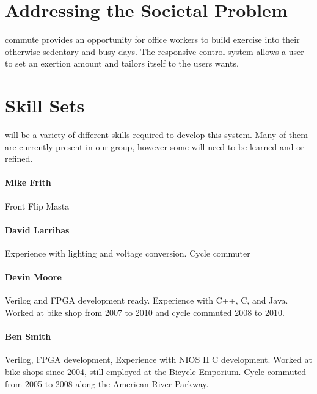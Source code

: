 \documentclass[12pt,article]{IEEEtran}
\begin{document}

	 
\section{Addressing the Societal Problem}
	
     commute provides an opportunity for office workers to build exercise into 
    their otherwise sedentary and busy days. The responsive control system allows a user to set an 
	exertion amount and tailors itself to the users wants. 

\section{Skill Sets}
	 will be a variety of different skills required to develop this system.
	 Many of them are currently present in our group, however some will need to be learned and or
	 refined.

	\paragraph{Mike Frith}
		Front Flip Masta

	\paragraph{David Larribas}
		Experience with lighting and voltage conversion. Cycle commuter

	\paragraph{Devin Moore}
	Verilog and FPGA development ready. Experience with C++, C, and Java. Worked at bike 
	shop from 2007 to 2010 and cycle commuted 2008 to 2010.
	
	\paragraph{Ben Smith}
	Verilog, FPGA development, Experience with NIOS II C development. Worked at bike shops since 
	2004, still employed at the Bicycle Emporium. Cycle commuted from 2005 to 2008 along the
	American River Parkway.
\end{document}
